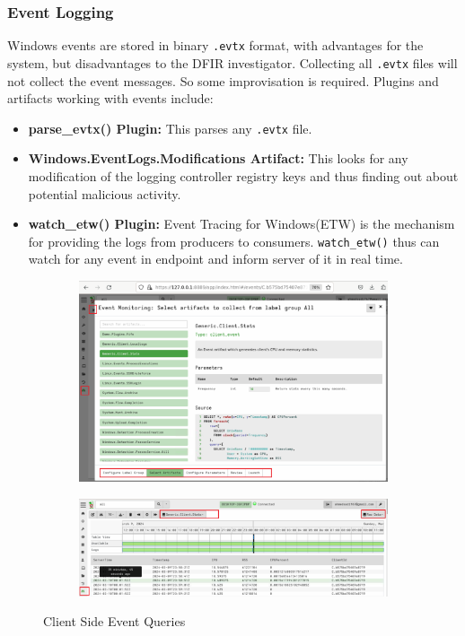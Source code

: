 \documentclass[a4paper, 11pt, oneside]{article} %
\begin{document}
\subsubsection{Event Logging}
Windows events are stored in binary \verb|.evtx| format, with advantages for the system, but disadvantages to the DFIR investigator. Collecting all \verb|.evtx| files will not collect the event messages. So some improvisation is required. Plugins and artifacts working with events include:
\begin{itemize}
    \item \textbf{parse\_evtx() Plugin:} This parses any \verb|.evtx| file.
    \item \textbf{Windows.EventLogs.Modifications Artifact:} This looks for any modification of the logging controller registry keys and thus finding out about potential malicious activity.
    \item \textbf{watch\_etw() Plugin:} Event Tracing for Windows(ETW) is the mechanism for providing the logs from  producers to consumers. \verb|watch_etw()| thus can watch for any event in endpoint and inform server of it in real time. 
\end{itemize}
 \begin{figure}[ht]
    \centering
    \begin{subfigure}{0.45\linewidth}
        \includegraphics[width=\linewidth, center]{img/forensic/log1.png}
        \label{fig:log1}
    \end{subfigure}
    \begin{subfigure}{0.45\linewidth}
        \includegraphics[width=\linewidth, center]{img/forensic/log2.png}
        \label{fig:log2}
    \end{subfigure}

    \caption{Client Side Event Queries}
    \label{fig:log}
\end{figure}
   
\end{document}
